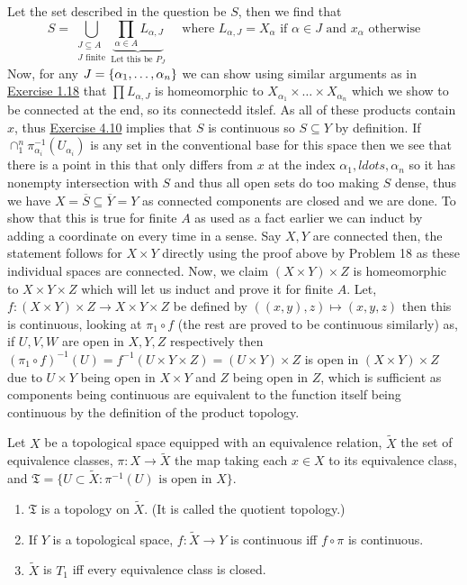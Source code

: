 \documentclass[12pt,a4paper]{article}
\begin{document}
\begin{solution}
Let the set described in the question be $S$, then we find that
\[
    S=\bigcup_{\substack{J\subseteq A\\ J\text{ finite}}}\underbrace{\prod_{\alpha\in A}L_{\alpha,J}}_{\text{Let this be }P_J}\quad\text{ where }L_{\alpha,J}=X_\alpha\text{ if }\alpha\in J\text{ and }x_\alpha\text{ otherwise}
\]
Now, for any $J= \qty{\alpha_1,\ldots,\alpha_n}$ we can show using similar arguments as in \hyperref[prob:4-18]{Exercise 1.18} that $\prod L_{\alpha,J}$ is homeomorphic to $X_{\alpha_1}\times\ldots\times X_{\alpha_n}$ which we show to be connected at the end, so its connectedd itslef. 
As all of these products contain $x$, thus \hyperref[prob:4-10]{Exercise 4.10} implies that $S$ is continuous so $S\subseteq Y$ by definition. 
If $\cap_1^n\pi_{\alpha_i}^{-1}(U_{\alpha_i})$ is any set in the conventional base for this space then we see that there is a point in this that only differs from $x$ at the index $\alpha_1,ldots,\alpha_n$ so it has nonempty intersection with $S$ and thus all open sets do too making $S$ dense, thus we have $X= \overline{S}\subseteq \overline{Y}=Y$ as connected components are closed and we are done. 
To show that this is true for finite $A$ as used as a fact earlier we can induct by adding a coordinate on every time in a sense. 
Say $X,Y$ are connected then, the statement follows for $X\times Y$ directly using the proof above by Problem 18 as these individual spaces are connected. 
Now, we claim $(X\times Y)\times Z$ is homeomorphic to $X\times Y\times Z$ which will let us induct and prove it for finite $A.$ 
Let, $f:(X\times Y)\times Z\to X\times Y\times Z$ be defined by $((x,y),z)\mapsto (x,y,z)$ then this is continuous, looking at $\pi_1\circ f$ (the rest are proved to be continuous similarly) as, if $U,V,W$ are open in $X,Y,Z$ respectively then $(\pi_1\circ f)^{-1}(U)=f^{-1}(U\times Y\times Z)=(U\times Y)\times Z$ is open in $(X\times Y)\times Z$ due to $U\times Y$ being open in $X\times Y$ and $Z$ being open in $Z$, which is sufficient as components being continuous are equivalent to the function itself being continuous by the definition of the product topology. 
\end{solution}
\begin{problem}\label{prob:4-28}
Let $X$ be a topological space equipped with an equivalence relation, $\tilde{X}$ the set of equivalence classes, $\pi : X \to \tilde{X}$ the map taking each $x \in X$ to its equivalence class, and $\mathfrak{T} = \{U \subset \tilde{X} : \pi^{-1}(U) \text{ is open in } X\}$.
\begin{enumerate}[label=\alph*.]
    \item $\mathfrak{T}$ is a topology on $\tilde{X}$. (It is called the quotient topology.)
    \item If $Y$ is a topological space, $f : \tilde{X} \to Y$ is continuous iff $f \circ \pi$ is continuous.
    \item $\tilde{X}$ is $T_1$ iff every equivalence class is closed.
\end{enumerate}
\end{problem}
\end{document}
